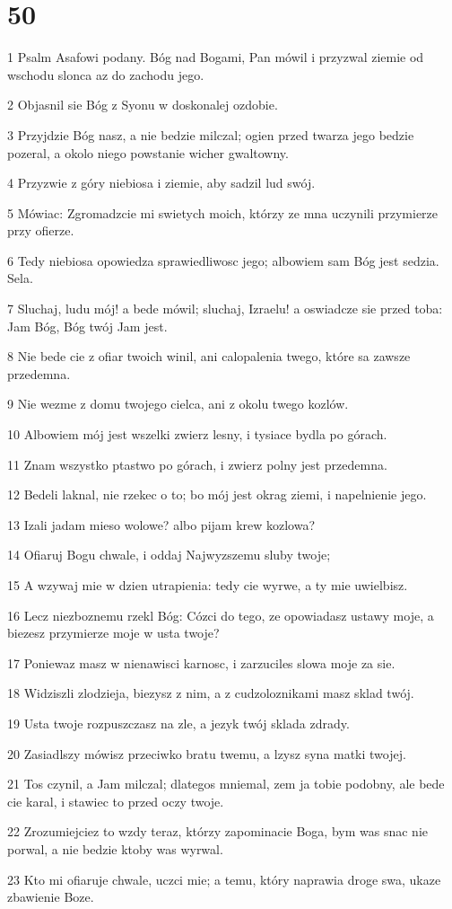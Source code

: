 \chapter{50}

\par 1 Psalm Asafowi podany. Bóg nad Bogami, Pan mówil i przyzwal ziemie od wschodu slonca az do zachodu jego.
\par 2 Objasnil sie Bóg z Syonu w doskonalej ozdobie.
\par 3 Przyjdzie Bóg nasz, a nie bedzie milczal; ogien przed twarza jego bedzie pozeral, a okolo niego powstanie wicher gwaltowny.
\par 4 Przyzwie z góry niebiosa i ziemie, aby sadzil lud swój.
\par 5 Mówiac: Zgromadzcie mi swietych moich, którzy ze mna uczynili przymierze przy ofierze.
\par 6 Tedy niebiosa opowiedza sprawiedliwosc jego; albowiem sam Bóg jest sedzia. Sela.
\par 7 Sluchaj, ludu mój! a bede mówil; sluchaj, Izraelu! a oswiadcze sie przed toba: Jam Bóg, Bóg twój Jam jest.
\par 8 Nie bede cie z ofiar twoich winil, ani calopalenia twego, które sa zawsze przedemna.
\par 9 Nie wezme z domu twojego cielca, ani z okolu twego kozlów.
\par 10 Albowiem mój jest wszelki zwierz lesny, i tysiace bydla po górach.
\par 11 Znam wszystko ptastwo po górach, i zwierz polny jest przedemna.
\par 12 Bedeli laknal, nie rzekec o to; bo mój jest okrag ziemi, i napelnienie jego.
\par 13 Izali jadam mieso wolowe? albo pijam krew kozlowa?
\par 14 Ofiaruj Bogu chwale, i oddaj Najwyzszemu sluby twoje;
\par 15 A wzywaj mie w dzien utrapienia: tedy cie wyrwe, a ty mie uwielbisz.
\par 16 Lecz niezboznemu rzekl Bóg: Cózci do tego, ze opowiadasz ustawy moje, a biezesz przymierze moje w usta twoje?
\par 17 Poniewaz masz w nienawisci karnosc, i zarzuciles slowa moje za sie.
\par 18 Widziszli zlodzieja, biezysz z nim, a z cudzoloznikami masz sklad twój.
\par 19 Usta twoje rozpuszczasz na zle, a jezyk twój sklada zdrady.
\par 20 Zasiadlszy mówisz przeciwko bratu twemu, a lzysz syna matki twojej.
\par 21 Tos czynil, a Jam milczal; dlategos mniemal, zem ja tobie podobny, ale bede cie karal, i stawiec to przed oczy twoje.
\par 22 Zrozumiejciez to wzdy teraz, którzy zapominacie Boga, bym was snac nie porwal, a nie bedzie ktoby was wyrwal.
\par 23 Kto mi ofiaruje chwale, uczci mie; a temu, który naprawia droge swa, ukaze zbawienie Boze.

